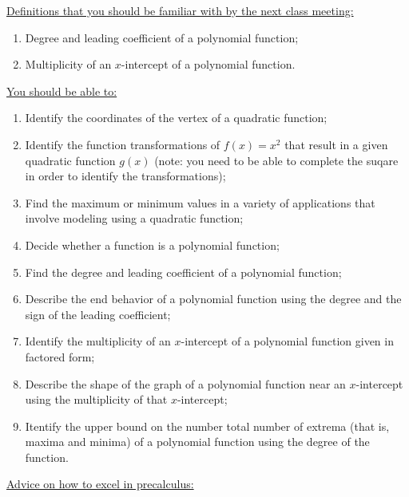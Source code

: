 \documentclass[12pt,dvipsnames]{article}
\begin{document}
 \begin{mdframed}[style=exampledefault,linecolor=blue,linewidth=4pt,frametitle={Looking Ahead to Next Week...}]
 	{\underline{Definitions that you should be familiar with by the next class meeting:} }
 	\begin{enumerate}[label= {  \arabic*:},labelindent=2em, style = standard,leftmargin=4pc, labelsep=*, noitemsep]
 		\item Degree and leading coefficient of a polynomial function;
\item Multiplicity of an $x$-intercept of a polynomial function.
 		
 	\end{enumerate}
 	{\underline{You should be able to:} }
 	\begin{enumerate}[label= {  \arabic*:},labelindent=2em, style = standard,leftmargin=4pc, labelsep=*, noitemsep]
 		\item Identify the coordinates of the vertex of a quadratic function;
                     \item Identify the function transformations of $\displaystyle f(x)=x^2$ that result in a given quadratic function $g(x)$ (note: you need to be able to complete the suqare in order to identify the transformations);
\item Find the maximum or minimum values in a variety of applications that involve modeling using a quadratic function;
                     \item Decide whether a function is a polynomial function;
\item Find the degree and leading coefficient of a polynomial function; 
\item Describe the end behavior of a polynomial function using the degree and the sign of the leading coefficient;
\item Identify the multiplicity of an $x$-intercept of a polynomial function given in factored form;
\item Describe the shape of the graph of a polynomial function near an $x$-intercept using the multiplicity of that $x$-intercept;
\item Itentify the upper bound on the number total number of extrema (that is, maxima and minima) of a polynomial function using the degree of the function.
 	\end{enumerate}
{\underline{Advice on how to excel in precalculus:} }

\end{mdframed}
\end{document}
